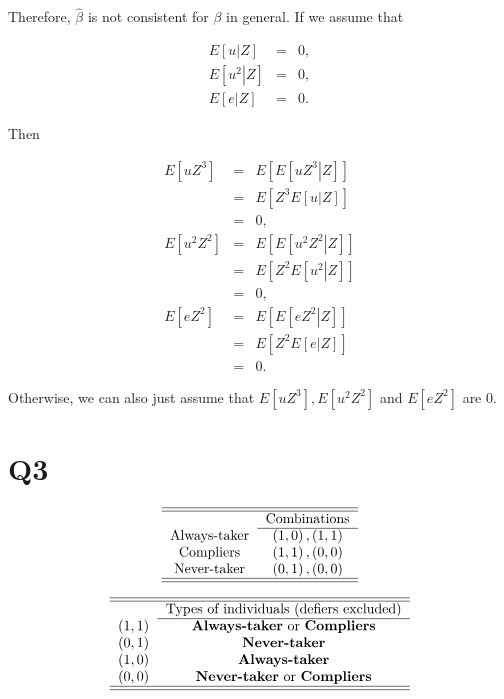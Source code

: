 \documentclass{article}
\begin{document}
Therefore, $\hat{\beta}$ is not consistent for $\beta $ in general. If we
assume that

\begin{eqnarray*}
E\left[ \left. u\right\vert Z\right] &=&0, \\
E\left[ \left. u^{2}\right\vert Z\right] &=&0, \\
E\left[ \left. e\right\vert Z\right] &=&0.
\end{eqnarray*}

Then

\begin{eqnarray*}
E\left[ uZ^{3}\right] &=&E\left[ E\left[ \left. uZ^{3}\right\vert Z\right] %
\right] \\
&=&E\left[ Z^{3}E\left[ \left. u\right\vert Z\right] \right] \\
&=&0, \\
E\left[ u^{2}Z^{2}\right] &=&E\left[ E\left[ \left. u^{2}Z^{2}\right\vert Z%
\right] \right] \\
&=&E\left[ Z^{2}E\left[ \left. u^{2}\right\vert Z\right] \right] \\
&=&0, \\
E\left[ eZ^{2}\right] &=&E\left[ E\left[ \left. eZ^{2}\right\vert Z\right] %
\right] \\
&=&E\left[ Z^{2}E\left[ \left. e\right\vert Z\right] \right] \\
&=&0.
\end{eqnarray*}

Otherwise, we can also just assume that $E\left[ uZ^{3}\right] ,E\left[
u^{2}Z^{2}\right] $ and $E\left[ eZ^{2}\right] $ are $0$.

\section*{Q3}

\begin{equation*}
\begin{tabular}{cc}
\hline\hline
& Combinations \\ \cline{2-2}
Always-taker & $\left( 1,0\right) ,\left( 1,1\right) $ \\ 
Compliers & $\left( 1,1\right) ,\left( 0,0\right) $ \\ 
Never-taker & $\left( 0,1\right) ,\left( 0,0\right) $ \\ \hline\hline
\end{tabular}%
\end{equation*}

\begin{equation*}
\begin{tabular}{cc}
\hline\hline
& Types of individuals (defiers excluded) \\ \cline{2-2}
$\left( 1,1\right) $ & \textbf{Always-taker} or \textbf{Compliers} \\ 
$\left( 0,1\right) $ & \textbf{Never-taker} \\ 
$\left( 1,0\right) $ & \textbf{Always-taker} \\ 
$\left( 0,0\right) $ & \textbf{Never-taker} or \textbf{Compliers} \\ 
\hline\hline
\end{tabular}%
\end{equation*}
\end{document}
